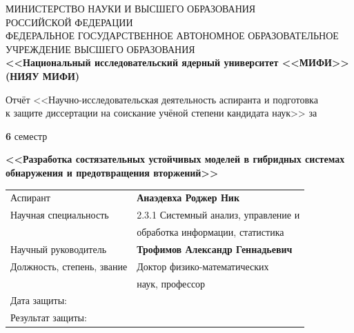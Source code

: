 
\begin{titlepage}
\thispagestyle{empty}
\begin{center}

{\small
МИНИСТЕРСТВО НАУКИ И ВЫСШЕГО ОБРАЗОВАНИЯ\\
РОССИЙСКОЙ ФЕДЕРАЦИИ\\
ФЕДЕРАЛЬНОЕ ГОСУДАРСТВЕННОЕ АВТОНОМНОЕ ОБРАЗОВАТЕЛЬНОЕ\\
УЧРЕЖДЕНИЕ ВЫСШЕГО ОБРАЗОВАНИЯ\\[2pt]
\textbf{<<Национальный исследовательский ядерный университет <<МИФИ>>}\\
\textbf{(НИЯУ МИФИ)}
}

\vspace{1.8cm}

{\small
Отчёт <<Научно-исследовательская деятельность аспиранта и подготовка\\
к защите диссертации на соискание учёной степени кандидата наук>> за
}

\vspace{0.5cm}

{\small
\underline{\hspace{1.2cm}}\textbf{6}\underline{\hspace{1.2cm}} семестр
}

\vspace{1.5cm}

{\small\textbf{<<Разработка состязательных устойчивых моделей в гибридных системах обнаружения и предотвращения вторжений>>}}

\vspace{2.5cm}

\begin{minipage}{0.82\textwidth}
\small\noindent
\begin{tabular}{@{}p{} p{}@{}}
Аспирант & \textbf{Анаэдевха Роджер Ник}\\
Научная специальность & 2.3.1 Системный анализ, управление и\\
 & обработка информации, статистика\\[1.2cm]
Научный руководитель & \textbf{Трофимов Александр Геннадьевич}\\
Должность, степень, звание & Доктор физико-математических\\
 & наук, профессор\\[1.2cm]
Дата защиты: & \\[0.6cm]
Результат защиты: & \\
\end{tabular}
\end{minipage}


\end{center}
\end{titlepage}

